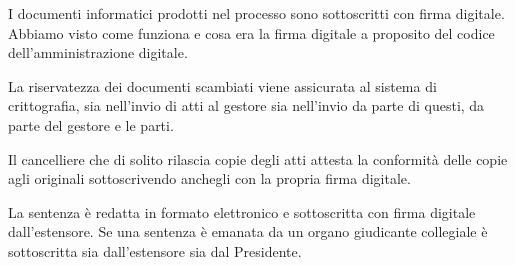 I documenti informatici prodotti nel processo sono sottoscritti con firma digitale. Abbiamo visto come funziona e cosa era la firma digitale a proposito del codice dell'amministrazione digitale. 

La riservatezza dei documenti scambiati viene assicurata al sistema di crittografia, sia nell'invio di atti al gestore sia nell'invio da parte di questi, da parte del gestore e le parti. 

Il cancelliere che di solito rilascia copie degli atti attesta la conformità delle copie agli originali sottoscrivendo anchegli con la propria firma digitale. 

La sentenza è redatta in formato elettronico e sottoscritta con firma digitale dall'estensore. Se una sentenza è emanata da un organo giudicante collegiale è sottoscritta sia dall'estensore sia dal Presidente.
